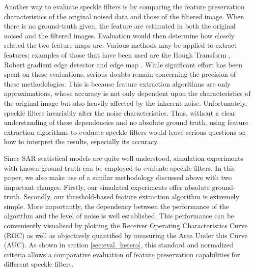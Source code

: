 \documentclass[journal]{IEEEtran}
\begin{document}
Another way to evaluate speckle filters is by comparing the feature preservation characteristics 
of the original noised data and those of the filtered image. 
When there is no ground-truth given, the feature are estimated in both the original noised and the filtered images.
Evaluation would then determine how closely related the two feature maps are. 
Various methods may be applied to extract features; examples of those that have been used are the 
	Hough Transform \cite{Medeiros_2003_IJRS}, Robert gradient edge detector \cite{Gagnon_SPIEProc_1997} 
	and edge map \cite{Frost_PAMI_1982}.
While significant effort has been spent on these evaluations, serious doubts remain concerning the precision 
of these methodologies.
This is because feature extraction algorithms are only approximations,
	whose accuracy is not only dependent upon the characteristics of the original image 
		but also heavily affected by 
		the inherent noise.
Unfortunately, speckle filters invariably alter the noise characteristics.
Thus, without a clear understanding of these dependencies and no absolute ground truth, 
	using feature extraction algorithms to evaluate speckle filters would leave serious questions on 
	how to interpret the results, especially its accuracy.

Since SAR statistical models are quite well understood, 
	simulation experiments with known ground-truth can be employed 
		to evaluate speckle filters.
In this paper, we also make use of a similar methodology discussed above with two important changes.
Firstly, our simulated experiments offer absolute ground-truth.
Secondly, our threshold-based feature extraction algorithm is extremely simple.
More importantly, the dependency between the performance of the algorithm and the level of noise is well established. 
This performance can be 
	conveniently visualised by plotting the Receiver Operating Characteristics Curve (ROC) 
	as well as objectively quantified by measuring the Area Under this Curve (AUC). 
As shown in section \ref{sec:eval_hetero}, this standard and normalized criteria allows a comparative evaluation of 
	feature preservation capabilities for different speckle filters.
\end{document}
